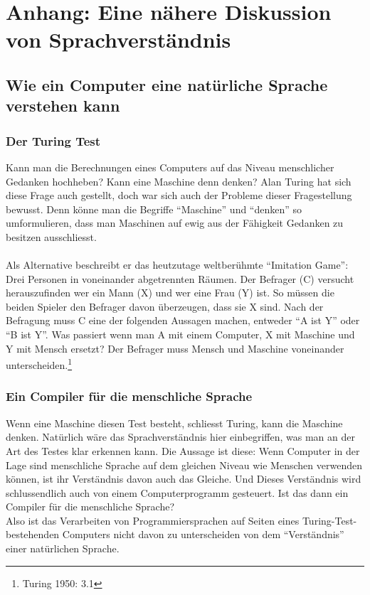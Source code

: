 \documentclass[10pt,a4paper]{article}
\begin{document}
\section{Anhang: Eine nähere Diskussion von Sprachverständnis}

\subsection{Wie ein Computer eine natürliche Sprache verstehen kann}
\subsubsection{Der Turing Test}
Kann man die Berechnungen eines Computers auf das Niveau menschlicher Gedanken hochheben? Kann eine Maschine denn denken? Alan Turing hat sich diese Frage auch gestellt, doch war sich auch der Probleme dieser Fragestellung bewusst. Denn könne man die Begriffe \enquote{Maschine} und \enquote{denken} so umformulieren, dass man Maschinen auf ewig aus der Fähigkeit Gedanken zu besitzen ausschliesst.\\
\\
Als Alternative beschreibt er das heutzutage weltberühmte \enquote{Imitation Game}:
Drei Personen in voneinander abgetrennten Räumen. Der Befrager (C) versucht herauszufinden wer ein Mann (X) und wer eine Frau (Y) ist. So müssen die beiden Spieler den Befrager davon überzeugen, dass sie X sind. Nach der Befragung muss C eine der folgenden Aussagen machen, entweder \enquote{A ist Y} oder \enquote{B ist Y}. Was passiert wenn man A mit einem Computer, X mit Maschine und Y mit Mensch ersetzt? Der Befrager muss Mensch und Maschine voneinander unterscheiden.\footnote{Turing 1950: 3.1} \\

\subsubsection{Ein Compiler für die menschliche Sprache}
Wenn eine Maschine diesen Test besteht, schliesst Turing, kann die Maschine denken. Natürlich wäre das Sprachverständnis hier einbegriffen, was man an der Art des Testes klar erkennen kann. Die Aussage ist diese: Wenn Computer in der Lage sind menschliche Sprache auf dem gleichen Niveau wie Menschen verwenden können, ist ihr Verständnis davon auch das Gleiche. Und Dieses Verständnis wird schlussendlich auch von einem Computerprogramm gesteuert. Ist das dann ein Compiler für die menschliche Sprache? \\
Also ist das Verarbeiten von Programmiersprachen auf Seiten eines Turing-Test-bestehenden Computers nicht davon zu unterscheiden von dem \enquote{Verständnis} einer natürlichen Sprache. \\
\end{document}
